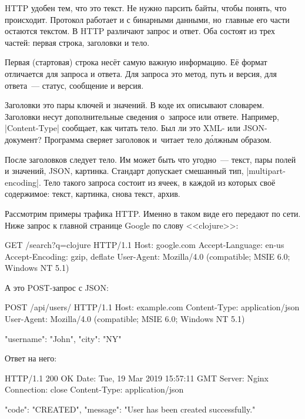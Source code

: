 HTTP удобен тем, что это текст. Не нужно парсить байты, чтобы понять, что
происходит. Протокол работает и с бинарными данными, но~главные его части
остаются текстом. В HTTP различают запрос и ответ. Оба состоят из трех частей:
первая строка, заголовки и тело.

Первая (стартовая) строка нес\"{е}т самую важную информацию. Е\"{е} формат отличается
для запроса и ответа. Для запроса это метод, путь и версия, для ответа~---
статус, сообщение и версия.


Заголовки это пары ключей и значений. В коде их описывают словарем. Заголовки
несут дополнительные сведения о~запросе или ответе. Например,
\spverb|Content-Type| сообщает, как читать тело. Был ли это XML- или
JSON-документ? Программа сверяет заголовок и~читает тело д\'{о}лжным образом.


После заголовков следует тело. Им может быть что угодно~--- текст, пары полей и
значений, JSON, картинка. Стандарт допускает смешанный тип,
\spverb|multipart-encoding|. Тело такого запроса состоит из ячеек, в каждой из
которых сво\"{е} содержимое: текст, картинка, снова текст, архив.

Рассмотрим примеры трафика HTTP. Именно в таком виде его передают по сети. Ниже
запрос к главной странице Google по слову <<clojure>>:

\begin{english}
  \begin{http}
GET /search?q=clojure HTTP/1.1
Host: google.com
Accept-Language: en-us
Accept-Encoding: gzip, deflate
User-Agent: Mozilla/4.0 (compatible; MSIE 6.0; Windows NT 5.1)
  \end{http}
\end{english}

\noindent
А это POST-запрос с JSON:

\begin{english}
  \begin{http}
POST /api/users/ HTTP/1.1
Host: example.com
Content-Type: application/json
User-Agent: Mozilla/4.0 (compatible; MSIE 6.0; Windows NT 5.1)

{
  "username": "John",
  "city": "NY"
}
  \end{http}
\end{english}

\noindent
Ответ на него:

\begin{english}
  \begin{http}
HTTP/1.1 200 OK
Date: Tue, 19 Mar 2019 15:57:11 GMT
Server: Nginx
Connection: close
Content-Type: application/json

{
  "code": "CREATED",
  "message": "User has been created successfully."
}
  \end{http}
\end{english}

